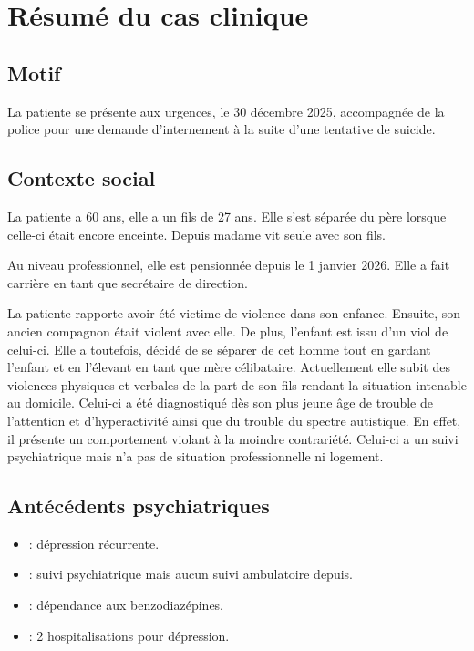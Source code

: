 \section{Résumé du cas clinique}

\subsection{Motif}
La patiente se présente aux urgences, le 30 décembre 2025, accompagnée de la police pour une demande d’internement à la suite d'une tentative de suicide.

\subsection{Contexte social}
La patiente a 60 ans, elle a un fils de 27 ans. Elle s’est séparée du père lorsque celle-ci était encore enceinte. Depuis madame vit seule avec son fils.

Au niveau professionnel, elle est pensionnée depuis le 1 janvier 2026. Elle a fait carrière en tant que secrétaire de direction.

La patiente rapporte avoir été victime de violence dans son enfance. 
Ensuite, son ancien compagnon était violent avec elle. De plus, l’enfant est issu d’un viol de celui-ci. Elle a toutefois, décidé de se séparer de cet homme tout en gardant l’enfant et en l’élevant en tant que mère célibataire. Actuellement elle subit des violences physiques et verbales de la part de son fils rendant la situation intenable au domicile. Celui-ci a été diagnostiqué dès son plus jeune âge de trouble de l’attention et d’hyperactivité ainsi que du trouble du spectre autistique. En effet, il présente un comportement violant à la moindre contrariété. Celui-ci a un suivi psychiatrique mais n’a pas de situation professionnelle ni logement.

\subsection{Antécédents psychiatriques}
\begin{itemize}[compact, label=\textbullet]
    \item {} : dépression récurrente.
    \item  {} : suivi psychiatrique mais aucun suivi ambulatoire depuis.
    \item {} : dépendance aux benzodiazépines.
    \item {} : 2 hospitalisations pour dépression.
\end{itemize}

